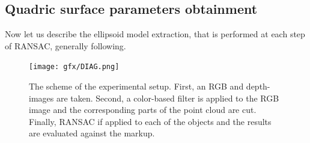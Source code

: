 \begin{algorithm}[ht!]
{        %
    }
\end{algorithm}

\subsection{Quadric surface parameters obtainment}
\label{subsec_quadric_surface_parameters_obtainment}

Now let us describe the ellipsoid model extraction, that is performed at each step of RANSAC, generally following\cite{groshong1989fitting}.

\begin{figure}[!htb]
  \centering
      \texttt{[image: gfx/DIAG.png]}
      \caption{The scheme of the experimental setup. First, an RGB and depth-images are taken. Second, a color-based filter is applied to the RGB image and the corresponding parts of the point cloud are cut. Finally, RANSAC if applied to each of the objects and the results are evaluated against the markup.}
      \label{fig:algo}
\end{figure}

